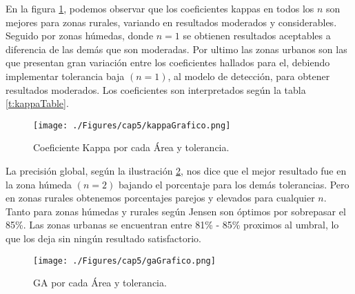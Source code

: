 En la figura \ref{fig:kappaGrafico}, podemos observar que los coeficientes kappas en todos los $ n  $ son mejores para zonas rurales, variando en resultados moderados y considerables. Seguido por zonas h\'umedas, donde $ n=1 $ se obtienen resultados aceptables a diferencia de las dem\'as que son moderadas. Por ultimo las zonas urbanos son las que presentan gran variaci\'on entre los coeficientes hallados para el, debiendo implementar tolerancia baja $(n=1)$, al modelo de detecci\'on, para obtener resultados moderados. Los coeficientes son interpretados seg\'un la tabla \ref{t:kappaTable}.
\begin{figure}[H]
	\centering
	\texttt{[image: ./Figures/cap5/kappaGrafico.png]}
	\caption{Coeficiente Kappa por cada \'Area y tolerancia.}
	\label{fig:kappaGrafico}
\end{figure}
La precisi\'on global, seg\'un la ilustraci\'on \ref{fig:gaGrafico}, nos dice que el mejor resultado fue en la zona h\'umeda $ (n=2) $ bajando el porcentaje para los dem\'as tolerancias. Pero en zonas rurales obtenemos porcentajes parejos y elevados para cualquier $ n $. Tanto para zonas h\'umedas y rurales seg\'un Jensen \cite{jensen1981urban} son \'optimos por sobrepasar el 85\%. Las zonas urbanas se encuentran entre 81\% - 85\% proximos al umbral, lo que los deja sin ning\'un resultado satisfactorio.
\begin{figure}[H]
	\centering
	\texttt{[image: ./Figures/cap5/gaGrafico.png]}
	\caption{GA por cada \'Area y tolerancia.}
	\label{fig:gaGrafico}
\end{figure}

